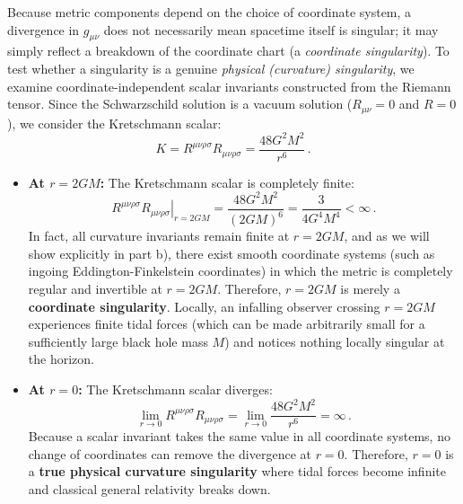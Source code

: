 \documentclass[12pt]{article}
\newcommand{\be}{\begin{equation}}
\newcommand{\ee}{\end{equation}}
\begin{document}
\begin{enumerate}[label=\alph*)]
Because metric components depend on the choice of coordinate system, a divergence in $g_{\mu\nu}$ does not necessarily mean spacetime itself is singular; it may simply reflect a breakdown of the coordinate chart (a \emph{coordinate singularity}). To test whether a singularity is a genuine \emph{physical (curvature) singularity}, we examine coordinate-independent scalar invariants constructed from the Riemann tensor. Since the Schwarzschild solution is a vacuum solution ($R_{\mu\nu} = 0$ and $R = 0$), we consider the Kretschmann scalar:
\be
K = R^{\mu\nu\rho\sigma} R_{\mu\nu\rho\sigma} = \frac{48 G^2 M^2}{r^6} \,.
\ee
\begin{itemize}
\item \textbf{At $r = 2GM$:} The Kretschmann scalar is completely finite:
\be
\left. R^{\mu\nu\rho\sigma} R_{\mu\nu\rho\sigma} \right|_{r=2GM} = \frac{48 G^2 M^2}{(2GM)^6} = \frac{3}{4 G^4 M^4} < \infty \,.
\ee
In fact, all curvature invariants remain finite at $r = 2GM$, and as we will show explicitly in part b), there exist smooth coordinate systems (such as ingoing Eddington-Finkelstein coordinates) in which the metric is completely regular and invertible at $r = 2GM$. Therefore, $r = 2GM$ is merely a \textbf{coordinate singularity}. Locally, an infalling observer crossing $r = 2GM$ experiences finite tidal forces (which can be made arbitrarily small for a sufficiently large black hole mass $M$) and notices nothing locally singular at the horizon.
\item \textbf{At $r = 0$:} The Kretschmann scalar diverges:
\be
\lim_{r \to 0} R^{\mu\nu\rho\sigma} R_{\mu\nu\rho\sigma} = \lim_{r \to 0} \frac{48 G^2 M^2}{r^6} = \infty \,.
\ee
Because a scalar invariant takes the same value in all coordinate systems, no change of coordinates can remove the divergence at $r = 0$. Therefore, $r = 0$ is a \textbf{true physical curvature singularity} where tidal forces become infinite and classical general relativity breaks down.
\end{itemize}


\end{enumerate}
\end{document}
